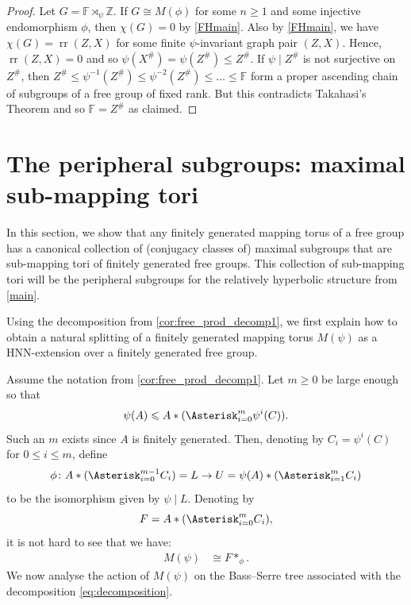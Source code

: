 \documentclass[11pt, a4paper]{amsart}
\theoremstyle{definition}
\newcommand{\isom}{\cong}
\newcommand{\F}{\mathbb{F}}
\newcommand{\Z}{\mathbb{Z}}
\DeclareMathOperator{\rr}{rr}
\begin{document}
\begin{proof}
Let $G = \F\rtimes_{\psi}\Z$. If $G\isom M(\phi)$ for some $n\geqslant 1$ and some injective endomorphism $\phi$, then $\chi(G) = 0$ by \cref{FHmain}. Also by \cref{FHmain}, we have $\chi(G) = \rr(Z, X)$ for some finite $\psi$-invariant graph pair $(Z, X)$. Hence, $\rr(Z, X) = 0$ and so $\psi(X^{\#}) = \psi(Z^{\#})\leqslant Z^{\#}$. If $\psi\mid Z^{\#}$ is not surjective on $Z^{\#}$, then $Z^{\#}\leqslant \psi^{-1}(Z^{\#})\leqslant \psi^{-2}(Z^{\#})\leqslant\ldots\leqslant \F$ form a proper ascending chain of subgroups of a free group of fixed rank. But this contradicts Takahasi's Theorem \cite{Ta51} and so $\F = Z^{\#}$ as claimed.
\end{proof}




\section{The peripheral subgroups: maximal sub-mapping tori}
\label{sec:peripherals}


In this section, we show that any finitely generated mapping torus of a free group has a canonical collection of (conjugacy classes of) maximal subgroups that are sub-mapping tori of finitely generated free groups. This collection of sub-mapping tori will be the peripheral subgroups for the relatively hyperbolic structure from \cref{main}.

Using the decomposition from \cref{cor:free_prod_decomp1}, we first explain how to obtain a natural splitting of a finitely generated mapping torus $M(\psi)$ as a HNN-extension over a finitely generated free group.

Assume the notation from \cref{cor:free_prod_decomp1}. Let $m\geqslant 0$ be large enough so that
\[
\psi(A)\leqslant A*(\Asterisk_{i=0}^m\psi^i(C)).
\]
Such an $m$ exists since $A$ is finitely generated. Then, denoting by $C_i = \psi^i(C)$ for $0\leqslant i\leqslant m$, define
\[
\phi\colon A*(\Asterisk_{i=0}^{m-1}C_i) = L \to U =  \psi(A)*(\Asterisk_{i=1}^mC_i)
\]
to be the isomorphism given by $\psi\mid L$. Denoting by
\[
F = A*(\Asterisk_{i=0}^mC_i),
\]
it is not hard to see that we have:
\begin{align}
\label{eq:decomposition}
M(\psi) &\isom F*_{\phi}.
\end{align}
We now analyse the action of $M(\psi)$ on the Bass--Serre tree associated with the decomposition \eqref{eq:decomposition}.
\end{document}
